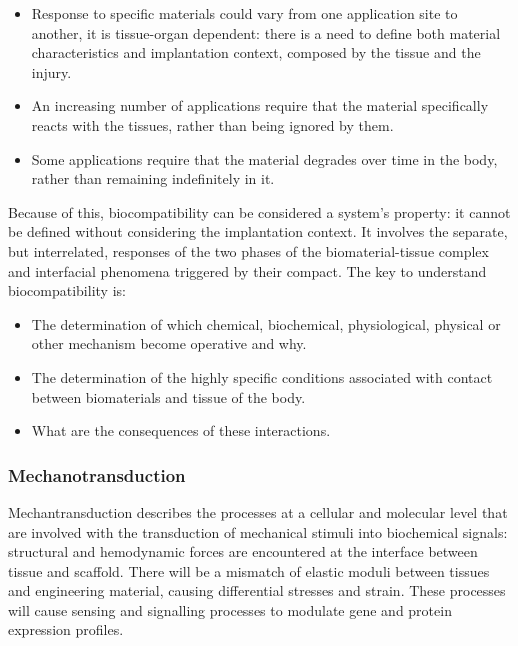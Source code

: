 	\begin{multicols}{2}
		\begin{itemize}
			\item Response to specific materials could vary from one application site to another, it is tissue-organ dependent: there is a need to define both material characteristics and implantation context, composed by the tissue and the injury.
			\item An increasing number of applications require that the material specifically reacts with the tissues, rather than being ignored by them.
			\item Some applications require that the material degrades over time in the body, rather than remaining indefinitely in it.
		\end{itemize}
	\end{multicols}

	Because of this, biocompatibility can be considered a system's property: it cannot be defined without considering the implantation context. It involves the separate, but interrelated, responses of the two phases of the biomaterial-tissue complex and interfacial phenomena triggered by their compact.
	The key to understand biocompatibility is:

	\begin{multicols}{2}
		\begin{itemize}
			\item The determination of which chemical, biochemical, physiological, physical or other mechanism become operative and why.
			\item The determination of the highly specific conditions associated with contact between biomaterials and tissue of the body.
			\item What are the consequences of these interactions.
		\end{itemize}
	\end{multicols}

		\subsubsection{Mechanotransduction}
		Mechantransduction describes the processes at a cellular and molecular level that are involved with the transduction of mechanical stimuli into biochemical signals: structural and hemodynamic forces are encountered at the interface between tissue and scaffold.
		There will be a mismatch of elastic moduli between tissues and engineering material, causing differential stresses and strain.
		These processes will cause sensing and signalling processes to modulate gene and protein expression profiles.


